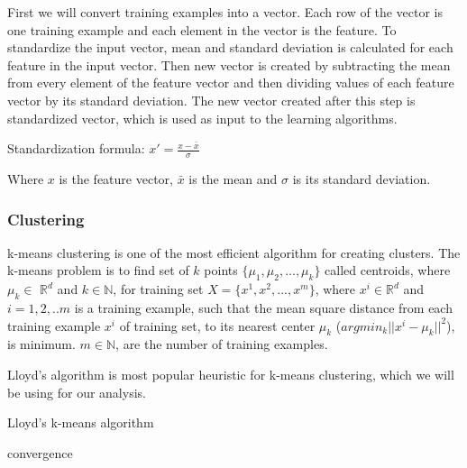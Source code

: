 \documentclass[10pt,oneside,a4paper]{article}
\begin{document}
First we will convert training examples into a vector. Each row of the vector is one training example and each element in the vector is the feature. To standardize the input vector, mean and standard deviation is calculated for each feature in the input vector. Then new vector is created by subtracting the mean from every element of the feature vector and then dividing values of each feature vector by its standard deviation. The new vector created after this step is standardized vector, which is used as input to the learning algorithms.

\hspace{2cm} Standardization formula: $x' = \frac{x - \bar{x}}{\sigma}$

Where $x$ is the feature vector, ${\bar{x}}$ is the mean and $\sigma$  is its standard deviation.

\subsubsection{Clustering}

k-means clustering is one of the most efficient algorithm for creating clusters. The k-means problem is to find set of $k$ points $\{\mu_{1}, \mu_{2}, ..., \mu_{k}\}$ called centroids, where $\mu_{k}\in$ $\mathbb{R}^d$ and $k \in \mathbb{N}$, for training set $X = \{x^{1}, x^{2}, ..., x^{m}\}$, where $x^{i} \in \mathbb{R}^d$
and $i= {1,2, ..m}$ is a training example, such that the mean square distance from each training example $x^{i}$ of training set, to its nearest center $\mu_{k}$ ($argmin_{k} || x^{i} {-} \mu_{k} ||^{2}$), is minimum. $m \in \mathbb{N}$, are the number of training examples.\cite{kmeanClustering}

Lloyd's algorithm is most popular heuristic for k-means clustering, which we will be using for our analysis.

\begin{algorithm}
\caption{Lloyd's k-means algorithm}\label{kmeans}
\begin{algorithmic}
\Repeat
  \EndFor
  \EndFor
\Until convergence
\end{algorithmic}
\end{algorithm}
\end{document}
